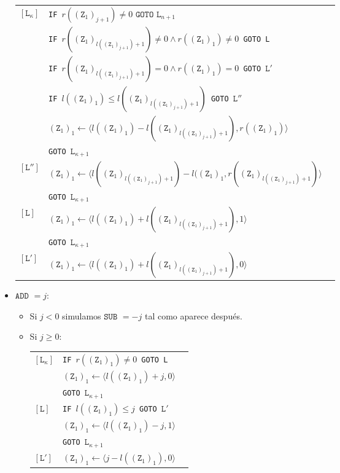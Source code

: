 \documentclass[twoside]{article}
\begin{document}
\begin{itemize}
\begin{tabular}{l l l}
$[\texttt{L}_\kappa]$&\texttt{IF }$r((\texttt{Z}_1)_{j+1})\neq 0\texttt{ GOTO }\texttt{L}_{n+1}$&\\
&\texttt{IF }$r((\texttt{Z}_1)_{l((\texttt{Z}_1)_{j+1})+1})\neq 0\land r((\texttt{Z}_1)_{1})\neq 0$\texttt{ GOTO L}&\\
&\texttt{IF }$r((\texttt{Z}_1)_{l((\texttt{Z}_1)_{j+1})+1})= 0\land r((\texttt{Z}_1)_1)= 0$\texttt{ GOTO }$\texttt{L}'$&\\
&\texttt{IF }$l((\texttt{Z}_1)_1)\leq l((\texttt{Z}_1)_{l((\texttt{Z}_1)_{j+1})+1})$\texttt{ GOTO }$\texttt{L}''$&\\
& $(\texttt{Z}_1)_1\leftarrow \langle l((\texttt{Z}_1)_1)-l((\texttt{Z}_1)_{l((\texttt{Z}_1)_{j+1})+1}),r((\texttt{Z}_{1})_1)\rangle$&\\
& \texttt{GOTO }$\texttt{L}_{\kappa+1}$& \\
$[\texttt{L}'']$& $(\texttt{Z}_1)_1\leftarrow \langle l((\texttt{Z}_1)_{l((\texttt{Z}_1)_{j+1})+1})-l((\texttt{Z}_1)_1,r((\texttt{Z}_1)_{l((\texttt{Z}_1)_{j+1})+1})\rangle$&\\
& \texttt{GOTO }$\texttt{L}_{\kappa+1}$& \\
$[\texttt{L}]$& $(\texttt{Z}_1)_1\leftarrow \langle l((\texttt{Z}_1)_{1})+l((\texttt{Z}_1)_{l((\texttt{Z}_1)_{j+1})+1}),1\rangle$&\\
& \texttt{GOTO }$\texttt{L}_{\kappa+1}$& \\
$[\texttt{L}']$& $(\texttt{Z}_1)_1\leftarrow \langle l((\texttt{Z}_1)_{1})+l((\texttt{Z}_1)_{l((\texttt{Z}_1)_{j+1})+1}),0\rangle$&
\end{tabular}



\item $\texttt{ADD }=j$:
\begin{itemize}
\item Si $j<0$ simulamos $\texttt{SUB }=-j$ tal como aparece después.

\item Si $j\geq 0$:

\begin{tabular}{l l l}
$[\texttt{L}_\kappa]$&\texttt{IF }$r((\texttt{Z}_1)_1)\neq 0$\texttt{ GOTO L}\\
&$(\texttt{Z}_1)_1\leftarrow \langle  l((\texttt{Z}_1)_1)+j,0\rangle$\\
&\texttt{GOTO }$\texttt{L}_{\kappa+1}$& \\
$[\texttt{L}]$&\texttt{IF }$l((\texttt{Z}_1)_1)\leq j$\texttt{ GOTO }$\texttt{L}'$&\\
&$(\texttt{Z}_1)_1\leftarrow \langle l((\texttt{Z}_1)_1)-j,1\rangle$\\
&\texttt{GOTO }$\texttt{L}_{\kappa+1}$& \\
$[\texttt{L}']$&$(\texttt{Z}_1)_1\leftarrow \langle j-l((\texttt{Z}_1)_1),0\rangle$
\end{tabular}
\end{itemize}
\end{itemize}
\end{document}
